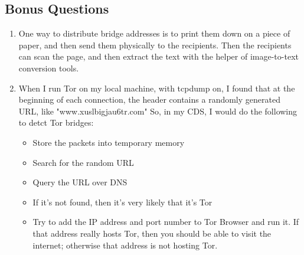 \documentclass[12pt]{article}
\begin{document}
\subsection*{Bonus Questions}
\begin{enumerate}
\item
One way to distribute bridge addresses is to print them down on a piece of paper, and then send them physically to the recipients.
Then the recipients can scan the page, and then extract the text with the helper of image-to-text conversion tools.
\item
When I run Tor on my local machine, with tcpdump on, I found that at the beginning of each connection, the header contains a randomly generated URL, like "www.xuslbigjau6tr.com" 
So, in my CDS, I would do the following to detct Tor bridges:
\begin{itemize}
\item
Store the packets into temporary memory
\item
Search for the random URL
\item
Query the URL over DNS
\item
If it's not found, then it's very likely that it's Tor
\item
Try to add the IP address and port number to Tor Browser and run it.
If that address really hosts Tor, then you should be able to visit the internet; otherwise that address is not hosting Tor.
\end{itemize}
\end{enumerate}
\end{document}
